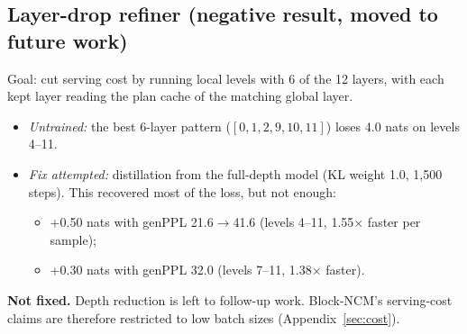 \subsection{Layer-drop refiner (negative result, moved to future work)}
Goal: cut serving cost by running local levels with 6 of the 12 layers, with each kept layer reading the plan
cache of the matching global layer.
\begin{itemize}[nosep]
  \item \emph{Untrained:} the best 6-layer pattern ($[0,1,2,9,10,11]$) loses 4.0 nats on levels 4--11.
  \item \emph{Fix attempted:} distillation from the full-depth model (KL weight 1.0, 1{,}500 steps). This
        recovered most of the loss, but not enough:
        \begin{itemize}[nosep]
          \item +0.50 nats with genPPL 21.6$\to$41.6 (levels 4--11, 1.55$\times$ faster per sample);
          \item +0.30 nats with genPPL 32.0 (levels 7--11, 1.38$\times$ faster).
        \end{itemize}
\end{itemize}
\textbf{Not fixed.} Depth reduction is left to follow-up work. Block-NCM's serving-cost claims are therefore
restricted to low batch sizes (Appendix~\ref{sec:cost}).

